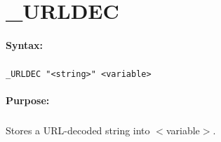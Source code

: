 
\newpage
\section{\_URLDEC}
\label{cmd:_URLDEC}

\paragraph{Syntax:}
\subparagraph{}
\texttt{\_URLDEC "<string>" <variable>}

\paragraph{Purpose:}
\subparagraph{}
Stores a URL-decoded string into $<$variable$>$.